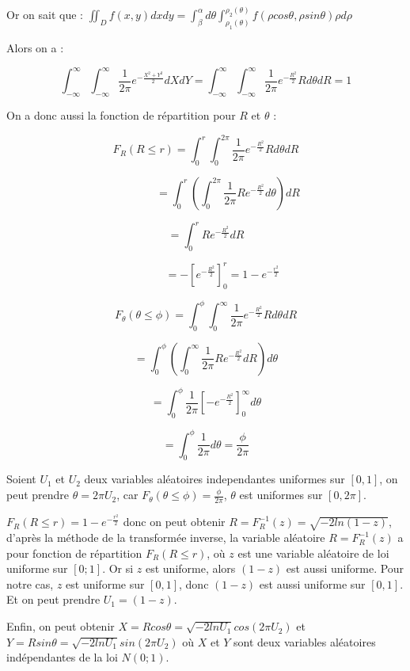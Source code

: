 \documentclass[]{article}
\begin{document}
Or on sait que : $\iint_{D}f(x,y)dxdy=\int_{\beta}^{\alpha}d\theta\int_{\rho_{1}(\theta)}^{\rho_{2}(\theta)}f(\rho cos\theta,\rho sin\theta)\rho d\rho$

Alors on a :

\[
\int_{-\infty}^{\infty}\int_{-\infty}^{\infty}\frac{1}{2\pi}e^{-\frac{X^{2}+Y^{2}}{2}}dXdY=\int_{-\infty}^{\infty}\int_{-\infty}^{\infty}\frac{1}{2\pi}e^{-\frac{R^{2}}{2}}Rd\theta dR=1
\]

On a donc aussi la fonction de répartition pour $R$ et $\theta$
:

\[
F_{R}(R\leqslant r)=\int_{0}^{r}\int_{0}^{2\pi}\frac{1}{2\pi}e^{-\frac{R^{2}}{2}}Rd\theta dR
\]

\[
\qquad\quad\quad=\int_{0}^{r}\left(\int_{0}^{2\pi}\frac{1}{2\pi}Re^{-\frac{R^{2}}{2}}d\theta\right)dR
\]

\[
=\int_{0}^{r}Re^{-\frac{R^{2}}{2}}dR
\]

\[
\qquad\quad=-\left[e^{-\frac{R^{2}}{2}}\right]_{0}^{r}=1-e^{-\frac{r^{2}}{2}}
\]

\[
F_{\theta}(\theta\leqslant\phi)=\int_{0}^{\phi}\int_{0}^{\infty}\frac{1}{2\pi}e^{-\frac{R^{2}}{2}}Rd\theta dR
\]

\[
=\int_{0}^{\phi}\left(\int_{0}^{\infty}\frac{1}{2\pi}Re^{-\frac{R^{2}}{2}}dR\right)d\theta
\]

\[
=\int_{0}^{\phi}\frac{1}{2\pi}\left[-e^{-\frac{R^{2}}{2}}\right]_{0}^{\infty}d\theta
\]

\[
=\int_{0}^{\phi}\frac{1}{2\pi}d\theta=\frac{\phi}{2\pi}
\]

Soient $U_{1}$ et $U_{2}$ deux variables aléatoires independantes
uniformes sur $[0,1]$, on peut prendre $\theta=2\pi U_{2}$, car
$F_{\theta}(\theta\leqslant\phi)=\frac{\phi}{2\pi}$, $\theta$ est
uniformes sur $[0,2\pi]$.

$F_{R}(R\leqslant r)=1-e^{-\frac{r^{2}}{2}}$ donc on peut obtenir
$R=F_{R}^{-1}(z)=\sqrt{-2ln(1-z)}$, d'après la méthode de la transformée
inverse, la variable aléatoire $R=F_{R}^{-1}(z)$ a pour fonction
de répartition $F_{R}(R\leqslant r)$, où $z$ est une variable aléatoire
de loi uniforme sur $[0;1]$. Or si $z$ est uniforme, alors $(1-z)$
est aussi uniforme. Pour notre cas, $z$ est uniforme sur $[0,1]$,
donc $(1-z)$ est aussi uniforme sur $[0,1]$. Et on peut prendre
$U_{1}=(1-z)$.

Enfin, on peut obtenir $X=Rcos\theta=\sqrt{-2lnU_{1}}cos(2\pi U_{2})$
et $Y=Rsin\theta=\sqrt{-2lnU_{1}}sin(2\pi U_{2})$ où $X$ et $Y$
sont deux variables aléatoires indépendantes de la loi $N(0;1)$.
\end{document}
